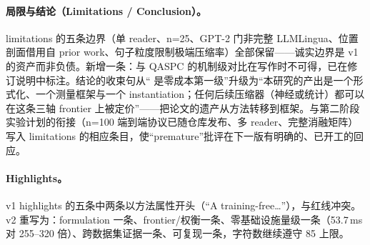 \paragraph{局限与结论（Limitations / Conclusion）。}
limitations 的五条边界（单 reader、n=25、GPT-2 门非完整 LLMLingua、位置剖面借用自 prior work、句子粒度限制极端压缩率）全部保留——诚实边界是 v1 的资产而非负债。新增一条：与 QASPC 的机制级对比在写作时不可得，已在修订说明中标注。结论的收束句从``\sieve{} 是零成本第一级''升级为``本研究的产出是一个形式化、一个测量框架与一个 instantiation；任何后续压缩器（神经或统计）都可以在这条三轴 frontier 上被定价''——把论文的遗产从方法转移到框架。与第二阶段实验计划的衔接（n=100 端到端协议已随仓库发布、多 reader、完整消融矩阵）写入 limitations 的相应条目，使``premature''批评在下一版有明确的、已开工的回应。

\paragraph{Highlights。}
v1 highlights 的五条中两条以方法属性开头（``A training-free\dots{}''），与红线冲突。v2 重写为：formulation 一条、frontier/权衡一条、零基础设施量级一条（53.7\,ms 对 255--320 倍）、跨数据集证据一条、可复现一条，字符数继续遵守 85 上限。
